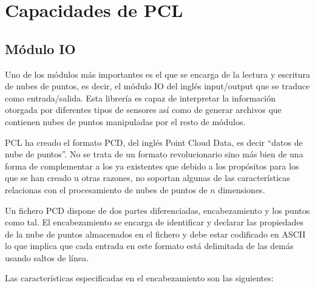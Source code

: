 \section{Capacidades de PCL}
\subsection{Módulo IO}
Uno de los módulos más importantes es el que se encarga de la lectura y escritura de nubes de puntos, es decir, el módulo IO del inglés input/output que se traduce como entrada/salida. Esta librería es capaz de interpretar la información otorgada por diferentes tipos de sensores así como de generar archivos que contienen nubes de puntos manipuladas por el resto de módulos.

PCL ha creado el formato PCD, del inglés Point Cloud Data, es decir ``datos de nube de puntos''. No se trata de un formato revolucionario sino más bien de una forma de complementar a los ya existentes que debido a los propósitos para los que se han creado u otras razones, no soportan algunas de las características relacionas con el procesamiento de nubes de puntos de $n$ dimensiones. 

Un fichero PCD dispone de dos partes diferenciadas, encabezamiento y los puntos como tal. El encabezamiento se encarga de identificar y declarar las propiedades de la nube de puntos almacenados en el fichero y debe estar codificado en ASCII lo que implica que cada entrada en este formato está delimitada de las demás usando saltos de línea.

Las características especificadas en el encabezamiento son las siguientes:

